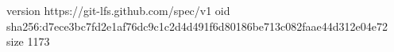 version https://git-lfs.github.com/spec/v1
oid sha256:d7ece3bc7fd2e1af76dc9c1c2d4d491f6d80186be713c082faae44d312e04e72
size 1173
